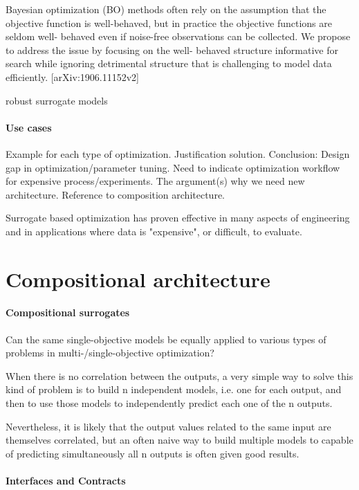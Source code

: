         Bayesian optimization (BO) methods often rely on the assumption that the objective function 
        is well-behaved, but in practice the objective functions are seldom well- behaved even if 
        noise-free observations can be collected. We propose to address the issue by focusing on 
        the well- behaved structure informative for search while ignoring detrimental structure 
        that is challenging to model data efficiently. [arXiv:1906.11152v2]

        robust surrogate models

        \cite{EngSurMod}        

        \paragraph{Use cases}
        Example for each type of optimization. Justification solution.
        Conclusion: Design gap in optimization/parameter tuning. 
        Need to indicate optimization workflow for expensive process/experiments. 
        The argument(s) why we need new architecture. Reference to composition architecture.

        Surrogate based optimization has proven effective in many aspects of engineering and in applications where data is "expensive", or difficult, to evaluate.

    \section{Compositional architecture}
        \paragraph{Compositional surrogates}
        Can the same single-objective models be equally applied to various types of problems in multi-/single-objective optimization?

        When there is no correlation between the outputs, a very simple way to solve this kind of problem is to build n independent models, i.e. one for each output, 
        and then to use those models to independently predict each one of the n outputs. 

        Nevertheless, it is likely that the output values related to the same input are themselves correlated, 
        but an often naive way to build multiple models to capable of predicting simultaneously all n outputs is often given good results. 


        \paragraph{Interfaces and Contracts}


